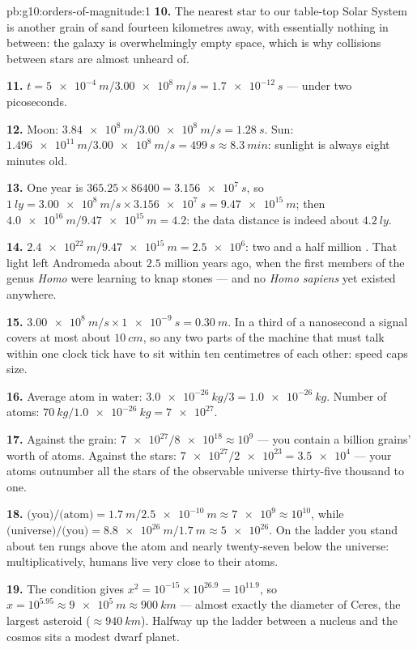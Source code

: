 \begin{solution}{pb:g10:orders-of-magnitude:1}
\textbf{10.} The nearest star to our table-top Solar System is another
grain of sand fourteen kilometres away, with essentially nothing in
between: the galaxy is overwhelmingly empty space, which is why
collisions between stars are almost unheard of.

\textbf{11.} $t = \qty{5e-4}{m}/\qty{3.00e8}{m/s} = \qty{1.7e-12}{s}$
--- under two picoseconds.

\textbf{12.} Moon: $\qty{3.84e8}{m}/\qty{3.00e8}{m/s} =
\qty{1.28}{s}$. Sun: $\qty{1.496e11}{m}/\qty{3.00e8}{m/s} =
\qty{499}{s} \approx \qty{8.3}{min}$: sunlight is always eight minutes
old.

\textbf{13.} One year is $365.25 \times 86400 = \qty{3.156e7}{s}$, so
$\qty{1}{ly} = \qty{3.00e8}{m/s} \times \qty{3.156e7}{s}
= \qty{9.47e15}{m}$; then
$\qty{4.0e16}{m}/\qty{9.47e15}{m} = 4.2$: the data distance is indeed
about $\qty{4.2}{ly}$.

\textbf{14.} $\qty{2.4e22}{m}/\qty{9.47e15}{m} = \num{2.5e6}$: two and
a half million . That light left Andromeda about $2.5$
million years ago, when the first members of the genus \emph{Homo}
were learning to knap stones --- and no \emph{Homo sapiens} yet
existed anywhere.

\textbf{15.} $\qty{3.00e8}{m/s} \times \qty{1e-9}{s} = \qty{0.30}{m}$.
In a third of a nanosecond a signal covers at most about
$\qty{10}{cm}$, so any two parts of the machine that must talk within
one clock tick have to sit within ten centimetres of each other:
speed caps size.

\textbf{16.} Average atom in water:
$\qty{3.0e-26}{kg}/3 = \qty{1.0e-26}{kg}$. Number of atoms:
$\qty{70}{kg}/\qty{1.0e-26}{kg} = \num{7e27}$.

\textbf{17.} Against the grain:
$\num{7e27}/\num{8e18} \approx 10^{9}$ --- you contain a billion
grains' worth of atoms. Against the stars:
$\num{7e27}/\num{2e23} = \num{3.5e4}$ --- your atoms outnumber all the
stars of the observable universe thirty-five thousand to one.

\textbf{18.} $\text{(you)}/\text{(atom)} =
\qty{1.7}{m}/\qty{2.5e-10}{m} \approx \num{7e9} \approx 10^{10}$,
while $\text{(universe)}/\text{(you)} =
\qty{8.8e26}{m}/\qty{1.7}{m} \approx \num{5e26}$. On the ladder you
stand about ten rungs above the atom and nearly twenty-seven below the
universe: multiplicatively, humans live very close to their atoms.

\textbf{19.} The condition gives
$x^{2} = 10^{-15} \times 10^{26.9} = 10^{11.9}$, so
$x = 10^{5.95} \approx \qty{9e5}{m} \approx \qty{900}{km}$ --- almost
exactly the diameter of Ceres, the largest asteroid
($\approx \qty{940}{km}$). Halfway up the ladder between a nucleus and
the cosmos sits a modest dwarf planet.


\end{solution}
